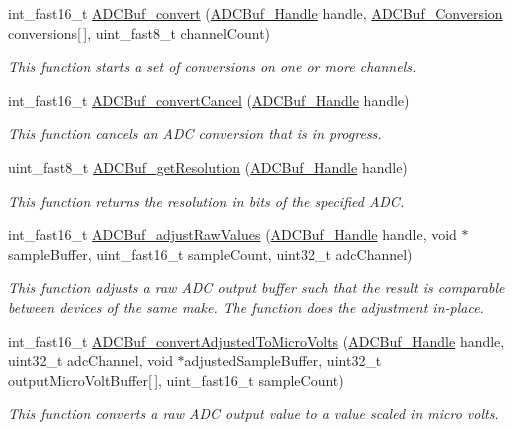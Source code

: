 \begin{DoxyCompactItemize}
int\+\_\+fast16\+\_\+t \hyperlink{_a_d_c_buf_8h_a762253a94875258c5a71b591f03f9d97}{A\+D\+C\+Buf\+\_\+convert} (\hyperlink{_a_d_c_buf_8h_a9b9646efcf7a7fd38a2935abd940cf96}{A\+D\+C\+Buf\+\_\+\+Handle} handle, \hyperlink{struct_a_d_c_buf___conversion}{A\+D\+C\+Buf\+\_\+\+Conversion} conversions\mbox{[}$\,$\mbox{]}, uint\+\_\+fast8\+\_\+t channel\+Count)
\begin{DoxyCompactList}\small\item\em This function starts a set of conversions on one or more channels. \end{DoxyCompactList}\item 
int\+\_\+fast16\+\_\+t \hyperlink{_a_d_c_buf_8h_a5201c27bddf11b9f9ae902807bded40d}{A\+D\+C\+Buf\+\_\+convert\+Cancel} (\hyperlink{_a_d_c_buf_8h_a9b9646efcf7a7fd38a2935abd940cf96}{A\+D\+C\+Buf\+\_\+\+Handle} handle)
\begin{DoxyCompactList}\small\item\em This function cancels an A\+D\+C conversion that is in progress. \end{DoxyCompactList}\item 
uint\+\_\+fast8\+\_\+t \hyperlink{_a_d_c_buf_8h_a2ff6d7db155bcd1367ef82a9f5cef19c}{A\+D\+C\+Buf\+\_\+get\+Resolution} (\hyperlink{_a_d_c_buf_8h_a9b9646efcf7a7fd38a2935abd940cf96}{A\+D\+C\+Buf\+\_\+\+Handle} handle)
\begin{DoxyCompactList}\small\item\em This function returns the resolution in bits of the specified A\+D\+C. \end{DoxyCompactList}\item 
int\+\_\+fast16\+\_\+t \hyperlink{_a_d_c_buf_8h_a6967c459b64a71b344bd88eb7fbaa097}{A\+D\+C\+Buf\+\_\+adjust\+Raw\+Values} (\hyperlink{_a_d_c_buf_8h_a9b9646efcf7a7fd38a2935abd940cf96}{A\+D\+C\+Buf\+\_\+\+Handle} handle, void $\ast$sample\+Buffer, uint\+\_\+fast16\+\_\+t sample\+Count, uint32\+\_\+t adc\+Channel)
\begin{DoxyCompactList}\small\item\em This function adjusts a raw A\+D\+C output buffer such that the result is comparable between devices of the same make. The function does the adjustment in-\/place. \end{DoxyCompactList}\item 
int\+\_\+fast16\+\_\+t \hyperlink{_a_d_c_buf_8h_ad0d8a8edbb43194a61d1284a10b02a8c}{A\+D\+C\+Buf\+\_\+convert\+Adjusted\+To\+Micro\+Volts} (\hyperlink{_a_d_c_buf_8h_a9b9646efcf7a7fd38a2935abd940cf96}{A\+D\+C\+Buf\+\_\+\+Handle} handle, uint32\+\_\+t adc\+Channel, void $\ast$adjusted\+Sample\+Buffer, uint32\+\_\+t output\+Micro\+Volt\+Buffer\mbox{[}$\,$\mbox{]}, uint\+\_\+fast16\+\_\+t sample\+Count)
\begin{DoxyCompactList}\small\item\em This function converts a raw A\+D\+C output value to a value scaled in micro volts. \end{DoxyCompactList}\end{DoxyCompactItemize}


